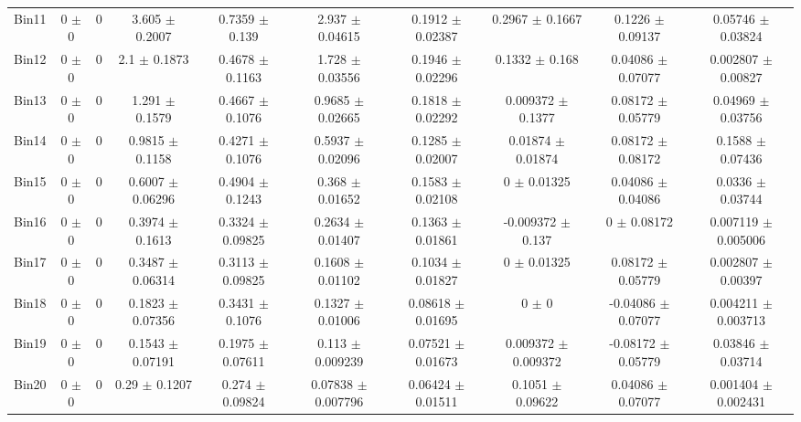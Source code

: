 \begin{tabular}{@{\extracolsep{4pt}}lccccccccc@{}}
     Bin11 & 0 $\pm$ 0 & 0 & 3.605 $\pm$ 0.2007 & 0.7359 $\pm$ 0.139 & 2.937 $\pm$ 0.04615 & 0.1912 $\pm$ 0.02387 & 0.2967 $\pm$ 0.1667 & 0.1226 $\pm$ 0.09137 & 0.05746 $\pm$ 0.03824 \\ 
     Bin12 & 0 $\pm$ 0 & 0 & 2.1 $\pm$ 0.1873 & 0.4678 $\pm$ 0.1163 & 1.728 $\pm$ 0.03556 & 0.1946 $\pm$ 0.02296 & 0.1332 $\pm$ 0.168 & 0.04086 $\pm$ 0.07077 & 0.002807 $\pm$ 0.00827 \\ 
     Bin13 & 0 $\pm$ 0 & 0 & 1.291 $\pm$ 0.1579 & 0.4667 $\pm$ 0.1076 & 0.9685 $\pm$ 0.02665 & 0.1818 $\pm$ 0.02292 & 0.009372 $\pm$ 0.1377 & 0.08172 $\pm$ 0.05779 & 0.04969 $\pm$ 0.03756 \\ 
     Bin14 & 0 $\pm$ 0 & 0 & 0.9815 $\pm$ 0.1158 & 0.4271 $\pm$ 0.1076 & 0.5937 $\pm$ 0.02096 & 0.1285 $\pm$ 0.02007 & 0.01874 $\pm$ 0.01874 & 0.08172 $\pm$ 0.08172 & 0.1588 $\pm$ 0.07436 \\ 
     Bin15 & 0 $\pm$ 0 & 0 & 0.6007 $\pm$ 0.06296 & 0.4904 $\pm$ 0.1243 & 0.368 $\pm$ 0.01652 & 0.1583 $\pm$ 0.02108 & 0 $\pm$ 0.01325 & 0.04086 $\pm$ 0.04086 & 0.0336 $\pm$ 0.03744 \\ 
     Bin16 & 0 $\pm$ 0 & 0 & 0.3974 $\pm$ 0.1613 & 0.3324 $\pm$ 0.09825 & 0.2634 $\pm$ 0.01407 & 0.1363 $\pm$ 0.01861 & -0.009372 $\pm$ 0.137 & 0 $\pm$ 0.08172 & 0.007119 $\pm$ 0.005006 \\ 
     Bin17 & 0 $\pm$ 0 & 0 & 0.3487 $\pm$ 0.06314 & 0.3113 $\pm$ 0.09825 & 0.1608 $\pm$ 0.01102 & 0.1034 $\pm$ 0.01827 & 0 $\pm$ 0.01325 & 0.08172 $\pm$ 0.05779 & 0.002807 $\pm$ 0.00397 \\ 
     Bin18 & 0 $\pm$ 0 & 0 & 0.1823 $\pm$ 0.07356 & 0.3431 $\pm$ 0.1076 & 0.1327 $\pm$ 0.01006 & 0.08618 $\pm$ 0.01695 & 0 $\pm$ 0 & -0.04086 $\pm$ 0.07077 & 0.004211 $\pm$ 0.003713 \\ 
     Bin19 & 0 $\pm$ 0 & 0 & 0.1543 $\pm$ 0.07191 & 0.1975 $\pm$ 0.07611 & 0.113 $\pm$ 0.009239 & 0.07521 $\pm$ 0.01673 & 0.009372 $\pm$ 0.009372 & -0.08172 $\pm$ 0.05779 & 0.03846 $\pm$ 0.03714 \\ 
     Bin20 & 0 $\pm$ 0 & 0 & 0.29 $\pm$ 0.1207 & 0.274 $\pm$ 0.09824 & 0.07838 $\pm$ 0.007796 & 0.06424 $\pm$ 0.01511 & 0.1051 $\pm$ 0.09622 & 0.04086 $\pm$ 0.07077 & 0.001404 $\pm$ 0.002431 \\ 
\hline\hline
  \end{tabular}
